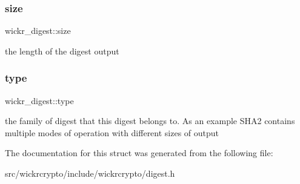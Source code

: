 \subsubsection{\texorpdfstring{size}{size}}
{\footnotesize\ttfamily wickr\+\_\+digest\+::size}

the length of the digest output \mbox{\label{structwickr__digest_ae82f086c339d1e384518dfc4359d4522}} 
\subsubsection{\texorpdfstring{type}{type}}
{\footnotesize\ttfamily wickr\+\_\+digest\+::type}

the family of digest that this digest belongs to. As an example S\+H\+A2 contains multiple modes of operation with different sizes of output 

The documentation for this struct was generated from the following file\+:\begin{DoxyCompactItemize}
\item 
src/wickrcrypto/include/wickrcrypto/digest.\+h\end{DoxyCompactItemize}
